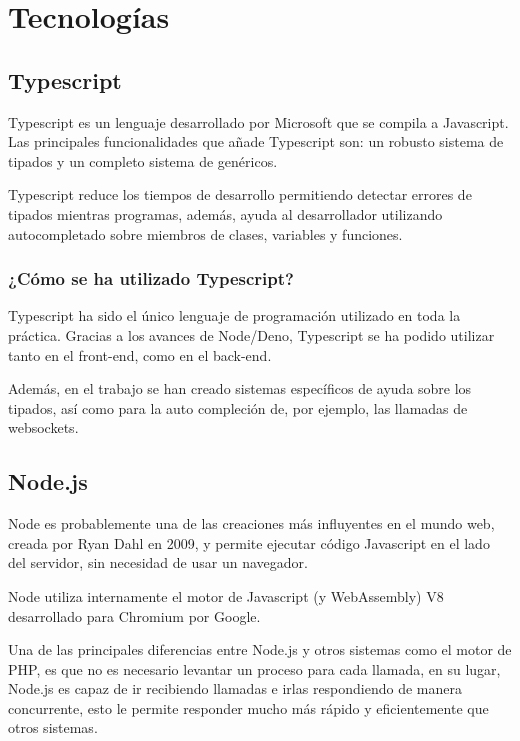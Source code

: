 
\section{Tecnologías}


\subsection{Typescript}
Typescript \cite{typescript_docs} es un lenguaje desarrollado por Microsoft que se compila a Javascript. Las principales funcionalidades que añade Typescript son: un robusto sistema de tipados y un completo sistema de genéricos.

Typescript reduce los tiempos de desarrollo permitiendo detectar errores de tipados mientras programas, además, ayuda al desarrollador utilizando autocompletado sobre miembros de clases, variables y funciones.

\subsubsection{¿Cómo se ha utilizado Typescript?}
Typescript ha sido el único lenguaje de programación utilizado en toda la práctica. Gracias a los avances de Node/Deno, Typescript se ha podido utilizar tanto en el front-end, como en el back-end.

Además, en el trabajo se han creado sistemas específicos de ayuda sobre los tipados, así como para la auto compleción de, por ejemplo, las llamadas de websockets.


\subsection{Node.js}
Node \cite{nodejs_docs} es probablemente una de las creaciones más influyentes en el mundo web, creada por Ryan Dahl en 2009, y permite ejecutar código Javascript en el lado del servidor, sin necesidad de usar un navegador.

Node utiliza internamente el motor de Javascript (y WebAssembly) V8 desarrollado para Chromium por Google.

Una de las principales diferencias entre Node.js y otros sistemas como el motor de PHP, es que no es necesario levantar un proceso para cada llamada, en su lugar, Node.js es capaz de ir recibiendo llamadas e irlas respondiendo de manera concurrente, esto le permite responder mucho más rápido y eficientemente que otros sistemas.

